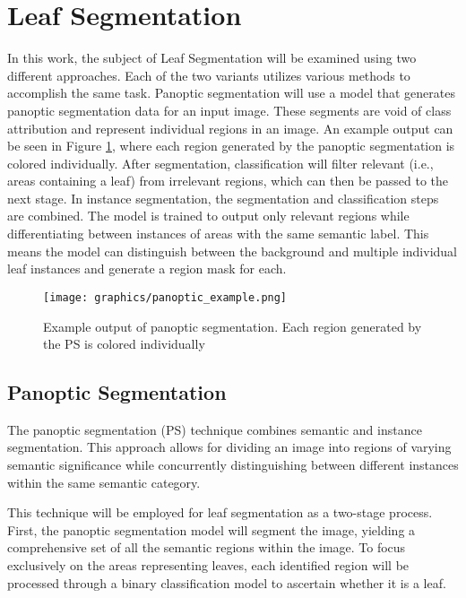 \documentclass[draft,final]{vutinfth} %
\begin{document}
\section{Leaf Segmentation} \label{sec:method_segmentation}

In this work, the subject of Leaf Segmentation will be examined using two different approaches. Each of the two variants utilizes various methods to accomplish the same task. Panoptic segmentation will use a model that generates panoptic segmentation data for an input image. These segments are void of class attribution and represent individual regions in an image. An example output can be seen in Figure \ref{fig:panoptic_example}, where each region generated by the panoptic segmentation is colored individually. After segmentation, classification will filter relevant (i.e., areas containing a leaf) from irrelevant regions, which can then be passed to the next stage.
In instance segmentation, the segmentation and classification steps are combined. The model is trained to output only relevant regions while differentiating between instances of areas with the same semantic label. This means the model can distinguish between the background and multiple individual leaf instances and generate a region mask for each.

\begin{figure}
    \centering
    \texttt{[image: graphics/panoptic\_example.png]}
    \caption{Example output of panoptic segmentation. Each region generated by the PS is colored individually}
    \label{fig:panoptic_example}
\end{figure}

\subsection{Panoptic Segmentation} \label{sec:meth_panoptic}
The panoptic segmentation (PS) technique combines semantic and instance segmentation. This approach allows for dividing an image into regions of varying semantic significance while concurrently distinguishing between different instances within the same semantic category.

This technique will be employed for leaf segmentation as a two-stage process. First, the panoptic segmentation model will segment the image, yielding a comprehensive set of all the semantic regions within the image. To focus exclusively on the areas representing leaves, each identified region will be processed through a binary classification model to ascertain whether it is a leaf.
\end{document}
